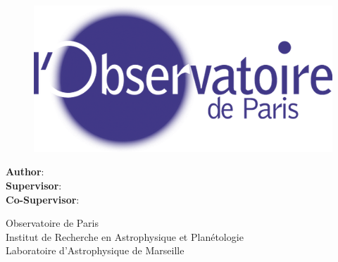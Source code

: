 \makeatletter
\begin{titlepage}
    \begin{center}
        \vspace*{.5cm}

        \Large
        \textbf{\@title}

        \vspace{1.5cm}
        
        \thesistype{}
        
        \vspace{1cm}

        \begin{figure}[htbp]
             \centering
             \includegraphics[width=.5\linewidth]{./Figures/logo_obspm.png}
        \end{figure}

        \vspace{1cm}

        \large
        \textbf{Author}: \thesisauthor{}\\
        \large
        \textbf{Supervisor}: \supervisor{}\\
        \large
        \textbf{Co-Supervisor}: \cosupervisor{}

        \vspace{1cm}
        \large
        Observatoire de Paris \\
        Institut de Recherche en Astrophysique et Planétologie \\
        Laboratoire d'Astrophysique de Marseille

        \vspace{1cm}
        \@date
        

\end{center}
\end{titlepage}
